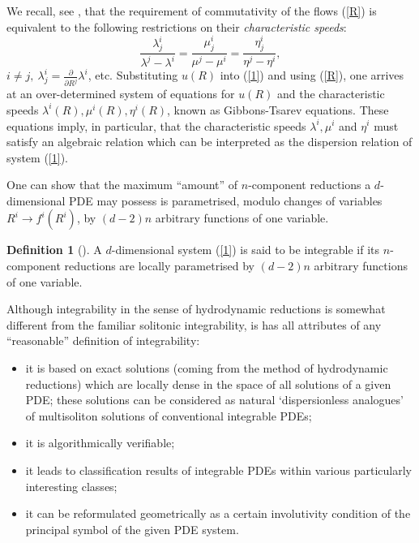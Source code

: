\documentclass[12pt, a4paper]{article}
\theoremstyle{definition}
\newtheorem*{definition}{Definition}
\begin{document}
We recall, see \cite{tsarev1991geometry}, that the requirement of  
commutativity of the flows (\ref{R})
is equivalent to the following restrictions on their \emph{characteristic speeds}:
\begin{equation}
\frac{\lambda_j
^i}{\lambda^j-\lambda^i}=\frac{\mu_j^i}{\mu^j-\mu^i}=\frac{\eta_j^i}{\eta^j-\eta^i},
\label{comm}
\end{equation}
$i\ne j, \  \lambda_j^i=\frac{\partial}{\partial { R^j}}\lambda^i$, etc.  Substituting ${ u}(R)$ into (\ref{1}) and using
(\ref{R}), one  arrives at an over-determined system of equations for  $u(R)$ and the characteristic speeds $\lambda^i(R), \mu^i(R), \eta^i(R)$, known as  Gibbons-Tsarev equations.  These equations imply, in particular, that the characteristic speeds $\lambda^i, \mu^i$ and $\eta^i$ must satisfy an algebraic relation which can be interpreted 
as the dispersion relation of system (\ref{1}). 


 One can show that the maximum ``amount''  of $n$-component reductions a $d$-dimensional PDE 
may possess is parametrised, modulo changes of variables $R^i\to
f^i(R^i)$,  by $(d-2)n$ arbitrary functions of one variable. 

\begin{definition}[\cite{ferapontov2004integrability, ferapontov2004hydrodynamic}]  A $d$-dimensional system (\ref{1}) is said to be integrable if its $n$-component reductions are locally parametrised by $(d-2)n$ arbitrary functions of one variable.
\end{definition}

Although integrability in the sense of hydrodynamic reductions is somewhat different from the familiar solitonic integrability, is has all attributes of any ``reasonable'' definition of integrability: 
\begin{itemize}

\item it is based on exact solutions (coming from the method of hydrodynamic reductions) which are locally dense in the space of all solutions of a given PDE; these solutions can be considered as natural `dispersionless analogues' of  multisoliton solutions of conventional integrable PDEs;

\item it is algorithmically verifiable;

\item it leads to classification results of  integrable PDEs within various particularly interesting classes;

\item it can be reformulated geometrically  as a certain involutivity condition of the principal symbol of the given PDE system.

\end{itemize}
\end{document}
